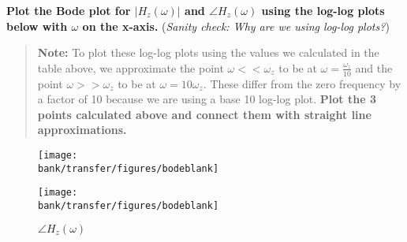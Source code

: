 \begin{enumerate}
\begin{enumerate}
    \qitem \textbf{Plot the Bode plot for $|H_z(\omega)|$ and $\angle H_z(\omega)$ using the log-log plots below with $\omega$ on the x-axis.} (\textit{Sanity check: Why are we using log-log plots?})

    \begin{quote}
    \textbf{Note:} To plot these log-log plots using the values we calculated in the table above, we approximate the point $\omega << \omega_z$
    to be at $\omega = \frac{\omega_z}{10}$ and the point $\omega >> \omega_z$ to be at $\omega = 10\omega_z$.
    These differ from the zero frequency by a factor of 10 because we are using a base 10 log-log plot. \textbf{Plot the 3 points calculated above and connect them with straight line approximations.}
    \end{quote}

\end{enumerate}

\begin{figure}[!ht]
  \centering
  \begin{minipage}[b]{0.45\textwidth}
  \texttt{[image: \\bank/transfer/figures/bodeblank]}
    \caption*{$|H_z(\omega)|$}
  \end{minipage}
  \hfill
  \begin{minipage}[b]{0.45\textwidth}
  \texttt{[image: \\bank/transfer/figures/bodeblank]}
    \caption*{$\angle H_z(\omega)$}
  \end{minipage}
\end{figure}

\end{enumerate}
